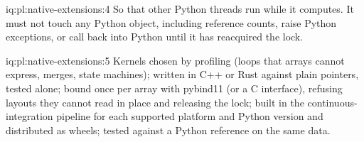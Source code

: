 \begin{solution}{iq:pl:native-extensions:4}
So that other Python threads run while it computes. It must not touch any Python object, including reference counts, raise Python
exceptions, or call back into Python until it has reacquired the lock.
\end{solution}

\begin{solution}{iq:pl:native-extensions:5}
Kernels chosen by profiling (loops that arrays cannot express, merges, state machines); written in C++ or Rust against plain pointers, tested
alone; bound once per array with pybind11 (or a C interface), refusing layouts they cannot read in place and releasing the lock; built in
the continuous-integration pipeline for each supported platform and Python version and distributed as wheels; tested against a Python
reference on the same data.
\end{solution}
